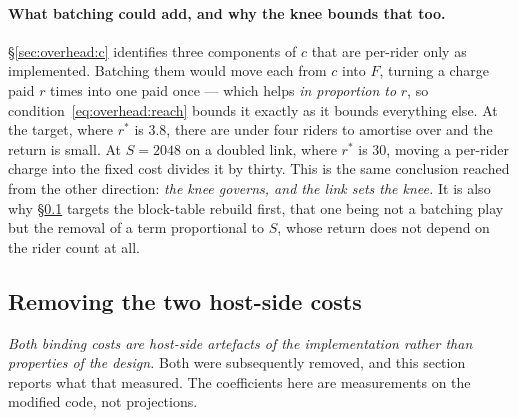 \paragraph{What batching could add, and why the knee bounds that too.}
\S\ref{sec:overhead:c} identifies three components of $c$ that are per-rider
only as implemented. Batching them would move each from $c$ into $F$, turning a
charge paid $r$ times into one paid once --- which helps \emph{in proportion to}
$r$, so condition~\ref{eq:overhead:reach} bounds it exactly as it bounds
everything else. At the target, where $r^{*}$ is 3.8, there are under four
riders to amortise over and the return is small. At $S{=}2048$ on a doubled
link, where $r^{*}$ is 30, moving a per-rider charge into the fixed cost divides
it by thirty. This is the same conclusion reached from the other direction:
\emph{the knee governs, and the link sets the knee.} It is also why
\S\ref{sec:overhead:opt} targets the block-table rebuild first, that one being
not a batching play but the removal of a term proportional to $S$, whose return
does not depend on the rider count at all.

\subsection{Removing the two host-side costs}
\label{sec:overhead:opt}

\emph{Both binding costs are host-side artefacts of the implementation rather
than properties of the design.} Both were subsequently removed, and this section
reports what that measured. The coefficients here are measurements on the
modified code, not projections.

